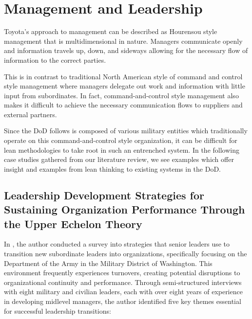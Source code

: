 \documentclass{article}
\begin{document}
	\section{Management and Leadership}

		Toyota's approach to management can be described as Hourensou style management that is multidimensional in nature.
		Managers communicate openly and information travels up, down, and sideways allowing for the necessary flow of information to the correct parties. 

		This is in contrast to traditional North American style of command and control style management where managers delegate out work and information with little input from subordinates.
		In fact, command-and-control style management also makes it difficult to achieve the necessary communication flows to suppliers and external partners.

		Since the DoD follows is composed of various military entities which traditionally operate on this command-and-control style organization, it can be difficult for lean methodologies to take root in such an entrenched system.
		In the following case studies gathered from our literature review, we see examples which offer insight and examples from lean thinking to existing systems in the DoD.


	\subsection{Leadership Development Strategies for Sustaining Organization Performance Through the Upper Echelon Theory \cite{McCants2024}}	

	In \cite{McCants2024}, the author conducted a survey into strategies that senior leaders use to transition new subordinate leaders into organizations, specifically focusing on the Department of the Army in the Military District of Washington. 
	This environment frequently experiences turnovers, creating potential disruptions to organizational continuity and performance.
	Through semi-structured interviews with eight military and civilian leaders, each with over eight years of experience in developing midlevel managers, the author identified five key themes essential for successful leadership transitions:
\end{document}
